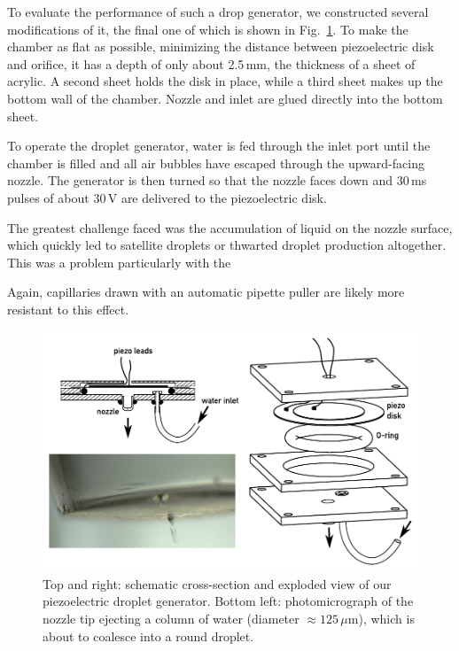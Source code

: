 \documentclass[11.5pt,oneside]{book}
\newcommand*{\figref}[1]{Fig.~\ref{#1}}
\begin{document}
To evaluate the performance of such a drop generator, we constructed several
modifications of it, the final one of which is shown in \figref{fig:flatyang}.
To make the chamber as flat as possible, minimizing the distance between
piezoelectric disk and orifice, it has a depth of only about 2.5$\,$mm, the
thickness of a sheet of acrylic. A second sheet holds the disk in place, while a
third sheet makes up the bottom wall of the chamber. Nozzle and inlet are glued
directly into the bottom sheet.

To operate the droplet generator, water is fed through
the inlet port until the chamber is filled and all air bubbles have escaped
through the upward-facing nozzle. The generator is then turned so that the nozzle
faces down and $30\,$ms pulses of about $30\,$V are delivered to the
piezoelectric disk.

The greatest challenge faced was the accumulation of liquid on the nozzle
surface, which quickly led to satellite droplets or thwarted droplet production
altogether. This was a problem particularly with the 

Again, capillaries drawn with an automatic pipette puller are likely
more resistant to this effect.

\begin{figure}
\centering
\includegraphics[width=\textwidth]{img/setup/flatyang_exploded.pdf}
\caption{Top and right: schematic cross-section and exploded view of our
    piezoelectric droplet generator. Bottom left: photomicrograph of the nozzle
    tip ejecting a column of water (diameter $\approx 125\,\mu$m), which is about to coalesce into a
round droplet. \label{fig:flatyang}}
\end{figure}
\end{document}
